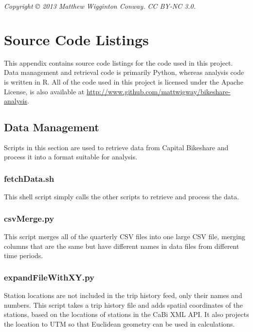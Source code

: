 \documentclass[letterpaper,11pt]{article}
\begin{document}
\vspace{5em}

\emph{Copyright © 2013 Matthew Wigginton Conway. CC BY-NC 3.0.}

\newpage
{}
\fancyhfoffset[E,O]{0pt}
\appendix
\section{Source Code Listings}

This appendix contains source code listings for the code used in this
project. Data management and retrieval code is primarily Python,
whereas analysis code is written in R. All of the code used in this
project is licensed under the Apache License, is also available at
\url{http://www.github.com/mattwigway/bikeshare-analysis}.

\subsection{Data Management}

Scripts in this section are used to retrieve data from Capital
Bikeshare and process it into a format suitable for analysis.

\subsubsection{fetchData.sh}
\label{fetchData.sh}

This shell script simply calls the other scripts to retrieve and
process the data.



\subsubsection{csvMerge.py}
\label{csvMerge.py}

This script merges all of the quarterly CSV files into one large CSV
file, merging columns that are the same but have different names in
data files from different time periods.



\subsubsection{expandFileWithXY.py}
\label{expandFileWithXY.py}

Station locations are not included in the trip history feed, only
their names and numbers. This script takes a trip history file and
adds spatial coordinates of the stations, based on the locations of
stations in the CaBi XML API. It also projects the location to UTM so that
Euclidean geometry can be used in calculations.
\end{document}
